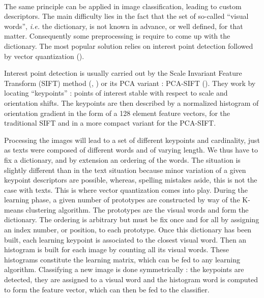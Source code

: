 \documentclass[a4paper]{report}
\begin{document}
\paragraph{}
The same principle can be applied in image classification, leading to custom descriptors. The main difficulty lies in the fact that the set of so-called ``visual words'', \textit{i.e.} the dictionary, is not known in advance, or well defined, for that matter. Consequently some preprocessing is require to come up with the dictionary. The most popular solution relies on interest point detection followed by vector quantization (\cite{BagOfWords}). 
\par
Interest point detection is usually carried out by the Scale Invariant Feature Transform (SIFT) method (\cite{SIFT}, \cite{SIFTExplained}) or its PCA variant : PCA-SIFT (\cite{PCASIFT}). They work by locating ``keypoints'' : points of interest stable with respect to scale and orientation shifts. The keypoints are then described by a normalized histogram of orientation gradient in the form of a 128 element feature vectors, for the traditional SIFT and in a more compact variant for the PCA-SIFT.
\par
Processing the images will lead to a set of different keypoints and cardinality, just as texts were composed of different words and of varying length. We thus have to fix a dictionary, and by extension an ordering of the words. The situation is slightly different than in the text situation because minor variation of a given keypoint descriptors are possible, whereas, spelling mistakes aside, this is not the case with texts. This is where vector quantization comes into play. During the learning phase, a given number of prototypes are constructed by way of the K-means clustering algorithm. The prototypes are the visual words and form the dictionary. The ordering is arbitrary but must be fix once and for all by assigning an index number, or position, to each prototype. Once this dictionary has been built, each learning keypoint is associated to the closest visual word. Then an histogram is built for each image by counting all its visual words. These histograms constitute the learning matrix, which can be fed to any learning algorithm. Classifying a new image is done symmetrically : the keypoints are detected, they are assigned to a visual word and the histogram word is computed to form the feature vector, which can then be fed to the classifier.
\end{document}
